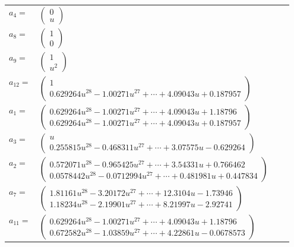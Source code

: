 \documentclass[1p]{elsarticle_modified}
\theoremstyle{definition}
\begin{document}
\begin{tabular}{m{7pt} m{180pt} m{7pt} m{180pt} }
\flushright $a_{4}=$&$\begin{pmatrix}0\\u\end{pmatrix}$ \\
\flushright $a_{8}=$&$\begin{pmatrix}1\\0\end{pmatrix}$ \\
\flushright $a_{9}=$&$\begin{pmatrix}1\\u^2\end{pmatrix}$ \\
\flushright $a_{12}=$&$\begin{pmatrix}1\\0.629264 u^{28}-1.00271 u^{27}+\cdots+4.09043 u+0.187957\end{pmatrix}$ \\
\flushright $a_{1}=$&$\begin{pmatrix}0.629264 u^{28}-1.00271 u^{27}+\cdots+4.09043 u+1.18796\\0.629264 u^{28}-1.00271 u^{27}+\cdots+4.09043 u+0.187957\end{pmatrix}$ \\
\flushright $a_{3}=$&$\begin{pmatrix}u\\0.255815 u^{28}-0.468311 u^{27}+\cdots+3.07575 u-0.629264\end{pmatrix}$ \\
\flushright $a_{2}=$&$\begin{pmatrix}0.572071 u^{28}-0.965425 u^{27}+\cdots+3.54331 u+0.766462\\0.0578442 u^{28}-0.0712994 u^{27}+\cdots+0.481981 u+0.447834\end{pmatrix}$ \\
\flushright $a_{7}=$&$\begin{pmatrix}1.81161 u^{28}-3.20172 u^{27}+\cdots+12.3104 u-1.73946\\1.18234 u^{28}-2.19901 u^{27}+\cdots+8.21997 u-2.92741\end{pmatrix}$ \\
\flushright $a_{11}=$&$\begin{pmatrix}0.629264 u^{28}-1.00271 u^{27}+\cdots+4.09043 u+1.18796\\0.672582 u^{28}-1.03859 u^{27}+\cdots+4.22861 u-0.0678573\end{pmatrix}$ \\

\end{tabular}
\end{document}
